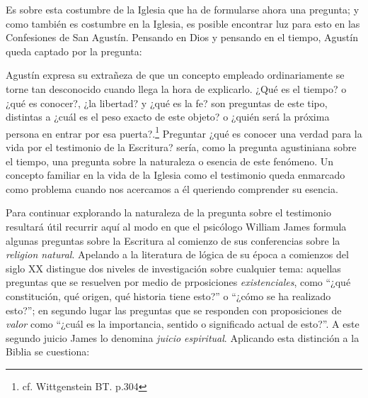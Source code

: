 Es sobre esta costumbre de la Iglesia que ha de formularse ahora una pregunta; y
como también es costumbre en la Iglesia, es posible encontrar luz para esto en
las Confesiones de San Agustín. Pensando en Dios y pensando en el tiempo,
Agustín queda captado por la pregunta: 

Agustín expresa su extrañeza de que un concepto empleado ordinariamente se torne
tan desconocido cuando llega la hora de explicarlo. ¿Qué es el tiempo? o ¿qué es
conocer?, ¿la libertad? y ¿qué es la fe? son preguntas de este tipo, distintas a
¿cuál es el peso exacto de este objeto? o ¿quién será la próxima persona en
entrar por esa puerta?.\footnote{cf. Wittgenstein BT. p.304} Preguntar ¿qué es
conocer una verdad para la vida por el testimonio de la Escritura? sería, como
la pregunta agustiniana sobre el tiempo, una pregunta sobre la naturaleza o
esencia de este fenómeno. Un concepto familiar en la vida de la Iglesia como el
testimonio queda enmarcado como problema cuando nos acercamos a él queriendo
comprender su esencia.

Para continuar explorando la naturaleza de la pregunta sobre el testimonio
resultará útil recurrir aquí al modo en que el psicólogo William James formula
algunas preguntas sobre la Escritura al comienzo de sus conferencias sobre la
\emph{religion natural}. Apelando a la literatura de lógica de su época a
comienzos del siglo XX distingue dos niveles de investigación sobre cualquier
tema: aquellas preguntas que se resuelven por medio de prposiciones
\emph{existenciales}, como ``¿qué constitución, qué origen, qué historia tiene
esto?'' o ``¿cómo se ha realizado esto?''; en segundo lugar las preguntas que se
responden con proposiciones de \emph{valor} como ``¿cuál es la importancia,
sentido o significado actual de esto?''. A este segundo juicio James lo denomina
\emph{juicio espiritual}. Aplicando esta distinción a la Biblia se cuestiona:


